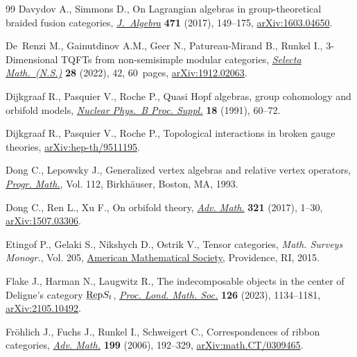 \documentclass[pdftex]{sigma}
\numberwithin{equation}{section}
\begin{document}
\begin{thebibliography}{99}
Davydov A., Simmons D., On {L}agrangian algebras in group-theoretical braided
 fusion categories, \href{https://doi.org/10.1016/j.jalgebra.2016.09.016}{\textit{J.~Algebra}} \textbf{471} (2017), 149--175,
 \href{https://arxiv.org/abs/1603.04650}{arXiv:1603.04650}.

De~Renzi M., Gainutdinov A.M., Geer N., Patureau-Mirand B., Runkel I.,
 3-{D}imensional {TQFT}s from non-semisimple modular categories,
 \href{https://doi.org/10.1007/s00029-021-00737-z}{\textit{Selecta Math.~(N.S.)}} \textbf{28} (2022), 42, 60~pages,
 \href{https://arxiv.org/abs/1912.02063}{arXiv:1912.02063}.

Dijkgraaf R., Pasquier V., Roche P., Quasi {H}opf algebras, group cohomology
 and orbifold models, \href{https://doi.org/10.1016/0920-5632(91)90123-V}{\textit{Nuclear Phys.~B Proc. Suppl.}} \textbf{18}
 (1991), 60--72.

Dijkgraaf R., Pasquier V., Roche P., Topological interactions in broken gauge
 theories, \href{https://arxiv.org/abs/hep-th/9511195}{arXiv:hep-th/9511195}.

Dong C., Lepowsky J., Generalized vertex algebras and relative vertex
 operators, \href{https://doi.org/10.1007/978-1-4612-0353-7}{\textit{Progr. Math.}}, Vol. 112, Birkh\"{a}user, Boston, MA, 1993.

Dong C., Ren L., Xu F., On orbifold theory, \href{https://doi.org/10.1016/j.aim.2017.09.032}{\textit{Adv. Math.}} \textbf{321}
 (2017), 1--30, \href{https://arxiv.org/abs/1507.03306}{arXiv:1507.03306}.

Etingof P., Gelaki S., Nikshych D., Ostrik V., Tensor categories, \textit{Math.
 Surveys Monogr.}, Vol. 205, \href{https://doi.org/10.1090/surv/205}{American Mathematical Society}, Providence, RI,
 2015.

Flake J., Harman N., Laugwitz R., The indecomposable objects in the center of
 {D}eligne's category {$\underline{\rm Re}{\rm p}S_t$}, \href{https://doi.org/10.1112/plms.12509}{\textit{Proc. Lond.
 Math. Soc.}} \textbf{126} (2023), 1134--1181, \href{https://arxiv.org/abs/2105.10492}{arXiv:2105.10492}.

Fr\"ohlich J., Fuchs J., Runkel I., Schweigert C., Correspondences of ribbon
 categories, \href{https://doi.org/10.1016/j.aim.2005.04.007}{\textit{Adv. Math.}} \textbf{199} (2006), 192--329,
 \href{https://arxiv.org/abs/math.CT/0309465}{arXiv:math.CT/0309465}.


\end{thebibliography}
\end{document}
